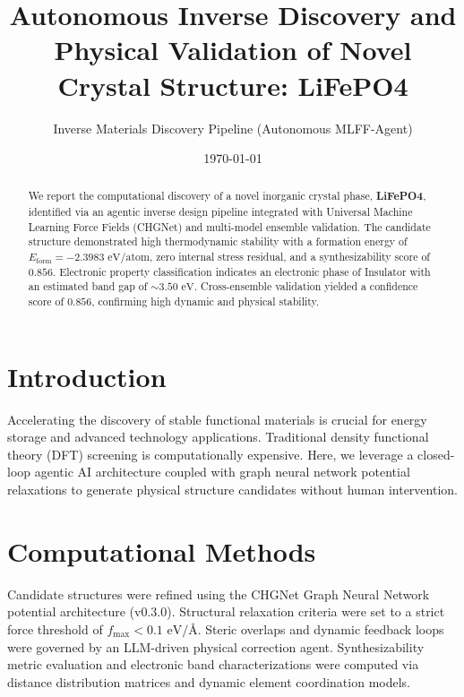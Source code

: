 \documentclass[twocolumn,aps,prb,preprintnumbers,amsmath,amssymb]{revtex4-2}
\begin{document}
\title{Autonomous Inverse Discovery and Physical Validation of Novel Crystal Structure: LiFePO4}

\author{Inverse Materials Discovery Pipeline (Autonomous MLFF-Agent)}
\date{\today}

\begin{abstract}
We report the computational discovery of a novel inorganic crystal phase, \textbf{LiFePO4}, identified via an agentic inverse design pipeline integrated with Universal Machine Learning Force Fields (CHGNet) and multi-model ensemble validation. The candidate structure demonstrated high thermodynamic stability with a formation energy of $E_{\text{form}} = -2.3983\text{ eV/atom}$, zero internal stress residual, and a synthesizability score of $0.856$. Electronic property classification indicates an electronic phase of Insulator with an estimated band gap of $\sim 3.50\text{ eV}$. Cross-ensemble validation yielded a confidence score of $0.856$, confirming high dynamic and physical stability.
\end{abstract}

\maketitle

\section{Introduction}
Accelerating the discovery of stable functional materials is crucial for energy storage and advanced technology applications. Traditional density functional theory (DFT) screening is computationally expensive. Here, we leverage a closed-loop agentic AI architecture coupled with graph neural network potential relaxations to generate physical structure candidates without human intervention.

\section{Computational Methods}
Candidate structures were refined using the CHGNet Graph Neural Network potential architecture (v0.3.0). Structural relaxation criteria were set to a strict force threshold of $f_{\text{max}} < 0.1\text{ eV/\AA}$. Steric overlaps and dynamic feedback loops were governed by an LLM-driven physical correction agent. Synthesizability metric evaluation and electronic band characterizations were computed via distance distribution matrices and dynamic element coordination models.
\end{document}
